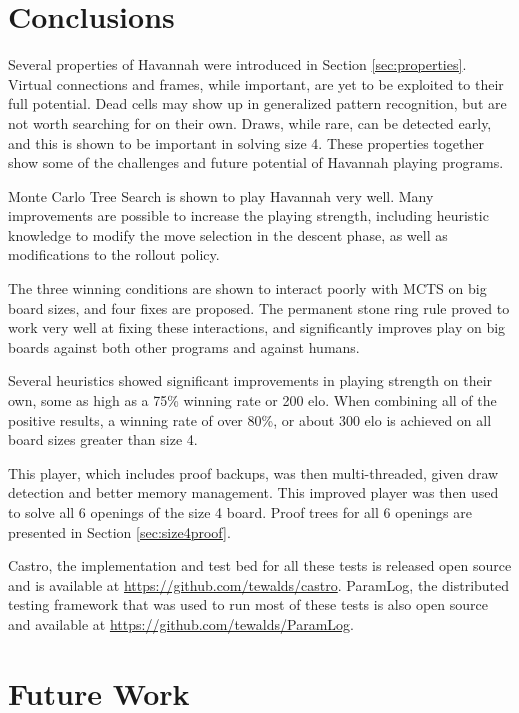 
\section{Conclusions}

Several properties of Havannah were introduced in Section \ref{sec:properties}. Virtual connections and frames, while important, are yet to be exploited to their full potential. Dead cells may show up in generalized pattern recognition, but are not worth searching for on their own. Draws, while rare, can be detected early, and this is shown to be important in solving size 4. These properties together show some of the challenges and future potential of Havannah playing programs.

Monte Carlo Tree Search is shown to play Havannah very well. Many improvements are possible to increase the playing strength, including heuristic knowledge to modify the move selection in the descent phase, as well as modifications to the rollout policy.

The three winning conditions are shown to interact poorly with MCTS on big board sizes, and four fixes are proposed. The permanent stone ring rule proved to work very well at fixing these interactions, and significantly improves play on big boards against both other programs and against humans.

Several heuristics showed significant improvements in playing strength on their own, some as high as a 75\% winning rate or 200 elo. When combining all of the positive results, a winning rate of over 80\%, or about 300 elo is achieved on all board sizes greater than size 4.

This player, which includes proof backups, was then multi-threaded, given draw detection and better memory management. This improved player was then used to solve all 6 openings of the size 4 board. Proof trees for all 6 openings are presented in Section \ref{sec:size4proof}.

Castro, the implementation and test bed for all these tests is released open source and is available at \url{https://github.com/tewalds/castro}. ParamLog, the distributed testing framework that was used to run most of these tests is also open source and available at \url{https://github.com/tewalds/ParamLog}.



\section{Future Work}


